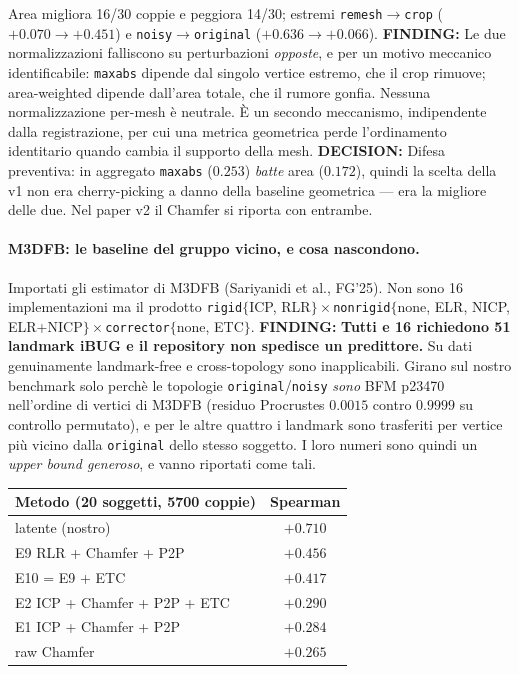 \documentclass[11pt,a4paper]{article}
\newcommand{\finding}[1]{\textcolor{finding}{\textbf{FINDING:}} #1}
\newcommand{\decision}[1]{\textcolor{decision}{\textbf{DECISION:}} #1}
\begin{document}
Area migliora 16/30 coppie e peggiora 14/30; estremi \texttt{remesh}$\to$\texttt{crop}
($+0.070 \to +0.451$) e \texttt{noisy}$\to$\texttt{original} ($+0.636 \to +0.066$).
\finding{Le due normalizzazioni falliscono su perturbazioni \emph{opposte}, e per un motivo
meccanico identificabile: \texttt{maxabs} dipende dal singolo vertice estremo, che il crop
rimuove; area-weighted dipende dall'area totale, che il rumore gonfia. Nessuna
normalizzazione per-mesh \`e neutrale. \`E un secondo meccanismo, indipendente dalla
registrazione, per cui una metrica geometrica perde l'ordinamento identitario quando cambia
il supporto della mesh.}
\decision{Difesa preventiva: in aggregato \texttt{maxabs} ($0.253$) \emph{batte}
area ($0.172$), quindi la scelta della v1 non era cherry-picking a danno della baseline
geometrica --- era la migliore delle due. Nel paper v2 il Chamfer si riporta con entrambe.}

\paragraph{M3DFB: le baseline del gruppo vicino, e cosa nascondono.}
Importati gli estimator di M3DFB (Sariyanidi et al., FG'25). Non sono 16 implementazioni ma
il prodotto \texttt{rigid}$\{$ICP, RLR$\}\times$\texttt{nonrigid}$\{$none, ELR, NICP,
ELR+NICP$\}\times$\texttt{corrector}$\{$none, ETC$\}$.
\finding{\textbf{Tutti e 16 richiedono 51 landmark iBUG e il repository non spedisce un
predittore.} Su dati genuinamente landmark-free e cross-topology sono inapplicabili. Girano
sul nostro benchmark solo perch\`e le topologie \texttt{original}/\texttt{noisy} \emph{sono}
BFM p23470 nell'ordine di vertici di M3DFB (residuo Procrustes $0.0015$ contro $0.9999$ su
controllo permutato), e per le altre quattro i landmark sono trasferiti per vertice pi\`u
vicino dalla \texttt{original} dello stesso soggetto. I loro numeri sono quindi un
\emph{upper bound generoso}, e vanno riportati come tali.}

\begin{center}
\begin{tabular}{lc}
\toprule
Metodo (20 soggetti, 5700 coppie) & Spearman \\
\midrule
latente (nostro) & $\mathbf{+0.710}$ \\
E9 \; RLR + Chamfer + P2P & $+0.456$ \\
E10 = E9 + ETC & $+0.417$ \\
E2 \; ICP + Chamfer + P2P + ETC & $+0.290$ \\
E1 \; ICP + Chamfer + P2P & $+0.284$ \\
raw Chamfer & $+0.265$ \\
\bottomrule
\end{tabular}
\end{center}
\end{document}
